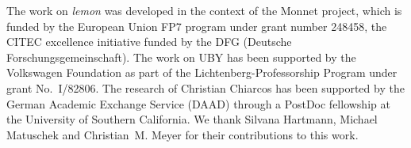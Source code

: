 \documentclass[graybox]{svmult}
\begin{document}




% 
 
 


\begin{acknowledgement}
The work on \emph{lemon} was developed in the context of the Monnet project, which is funded by the European Union FP7 program under
grant number 248458, the CITEC excellence initiative funded by the DFG (Deutsche Forschungsgemeinschaft).
The work on UBY has been supported by the Volks\-wagen Foundation as part of the Lichtenberg-Professorship Program under grant No.\ I/82806.
The research of Christian Chiarcos has been supported by the German Academic Exchange Service (DAAD) through a PostDoc fellowship at the University of Southern California.
We thank Silvana Hartmann, Michael Matuschek and Christian~M. Meyer for their contributions to this work.

\end{acknowledgement}

 
 
\end{document}

